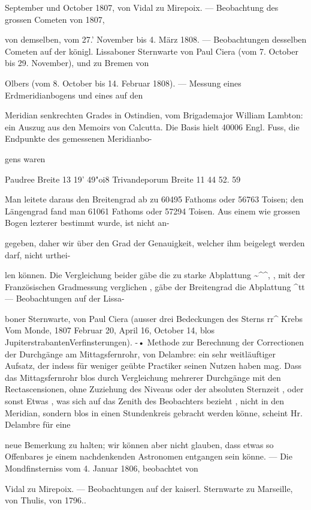 \documentclass[10pt,a4paper]{article}
\begin{document}
September und October 1807, von Vidal zu Mirepoix. — Beobachtung des grossen Cometen von 1807,

von demselben, vom 27.' November bis 4. März 1808. — Beobachtungen desselben Cometen auf der königl. Lissaboner Sternwarte von Paul Ciera (vom 7. October bis 29. November), und zu Bremen von

Olbers (vom 8. October bis 14. Februar 1808). — Messung eines Erdmeridianbogens und eines auf den

Meridian senkrechten Grades in Ostindien, vom Brigademajor William Lambton: ein Auszug aus den Memoirs von Calcutta. Die Basis hielt 40006 Engl. Fuss, die Endpunkte des gemessenen Meridianbo-

gens waren

Paudree Breite 13\textdegree{} 19' 49"oi8 Trivandeporum Breite 11 44 52. 59

Man leitete daraus den Breitengrad ab zu 60495 Fathoms oder 56763 Toisen; den Längengrad fand man 61061 Fathoms oder 57294 Toisen. Aus einem wie grossen Bogen lezterer bestimmt wurde, ist nicht an-

gegeben, daher wir über den Grad der Genauigkeit, welcher ihm beigelegt werden darf, nicht urthei-

len können. Die Vergleichung beider gäbe die zu starke Abplattung \textasciitilde{}\textasciicircum{}\textasciicircum{}, , mit der Französischen Gradmessung verglichen , gäbe der Breitengrad die Abplattung \textasciicircum{}tt — Beobachtungen auf der Lissa-

boner Sternwarte, von Paul Ciera (ausser drei Bedeckungen des Sterns rr\textasciicircum{} Krebs Vom Monde, 1807 Februar 20, April 16, October 14, blos JupiterstrabantenVerfinsterungen). -• Methode zur Berechnung der Correctionen der Durchgänge am Mittagsfernrohr, von Delambre: ein sehr weitläuftiger Aufsatz, der indess für weniger geübte Practiker seinen Nutzen haben mag. Dass das Mittagsfernrohr blos durch Vergleichung mehrerer Durchgänge mit den Rectascensionen, ohne Zuziehung des Niveaus oder der absoluten Sternzeit , oder sonst Etwas , was sich auf das Zenith des Beobachters bezieht , nicht in den Meridian, sondern blos in einen Stundenkreis gebracht werden könne, scheint Hr. Delambre für eine

neue Bemerkung zu halten; wir können aber nicht glauben, dass etwas so Offenbares je einem nachdenkenden Astronomen entgangen sein könne. — Die Mondfinsterniss vom 4. Januar 1806, beobachtet von

Vidal zu Mirepoix. — Beobachtungen auf der kaiserl. Sternwarte zu Marseille, von Thulis, von 1796..
\end{document}
